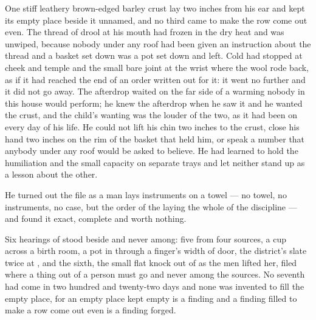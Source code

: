 One stiff leathery brown-edged barley crust lay two inches from his ear and kept its empty place beside it unnamed, and no third came to make the row come out even. The thread of drool at his mouth had frozen in the dry heat and was unwiped, because nobody under any roof had been given an instruction about the thread and a basket set down was a pot set down and left. Cold had stopped at cheek and temple and the small bare joint at the wrist where the wool rode back, as if it had reached the end of an order written out for it: it went no further and it did not go away. The afterdrop waited on the far side of a warming nobody in this house would perform; he knew the afterdrop when he saw it and he wanted the crust, and the child's wanting was the louder of the two, as it had been on every day of his life. He could not lift his chin two inches to the crust, close his hand two inches on the rim of the basket that held him, or speak a number that anybody under any roof would be asked to believe. He had learned to hold the humiliation and the small capacity on separate trays and let neither stand up as a lesson about the other.

\scenebreak

He turned out the file as a man lays instruments on a towel --- no towel, no instruments, no case, but the order of the laying the whole of the discipline --- and found it exact, complete and worth nothing.

Six hearings of  stood beside and never among: five from four sources, a cup across a birth room, a pot in  through a finger's width of door, the district's slate twice at , and the sixth, the small flat knock out of  as the men lifted her, filed where a thing out of a person must go and never among the sources. No seventh had come in two hundred and twenty-two days and none was invented to fill the empty place, for an empty place kept empty is a finding and a finding filled to make a row come out even is a finding forged.

